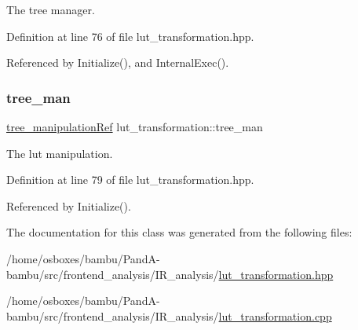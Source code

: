 The tree manager. 



Definition at line 76 of file lut\+\_\+transformation.\+hpp.



Referenced by Initialize(), and Internal\+Exec().

\mbox{\label{classlut__transformation_a6a64411dd9952dd7093c970a2a68e5d5}} 
\subsubsection{\texorpdfstring{tree\+\_\+man}{tree\_man}}
{\footnotesize\ttfamily \hyperlink{tree__manipulation_8hpp_a1a9460e3a2f9fc6a96cfd2f24cc9b2a5}{tree\+\_\+manipulation\+Ref} lut\+\_\+transformation\+::tree\+\_\+man\hspace{0.3cm}{\ttfamily [private]}}



The lut manipulation. 



Definition at line 79 of file lut\+\_\+transformation.\+hpp.



Referenced by Initialize().



The documentation for this class was generated from the following files\+:\begin{DoxyCompactItemize}
\item 
/home/osboxes/bambu/\+Pand\+A-\/bambu/src/frontend\+\_\+analysis/\+I\+R\+\_\+analysis/\hyperlink{lut__transformation_8hpp}{lut\+\_\+transformation.\+hpp}\item 
/home/osboxes/bambu/\+Pand\+A-\/bambu/src/frontend\+\_\+analysis/\+I\+R\+\_\+analysis/\hyperlink{lut__transformation_8cpp}{lut\+\_\+transformation.\+cpp}\end{DoxyCompactItemize}
